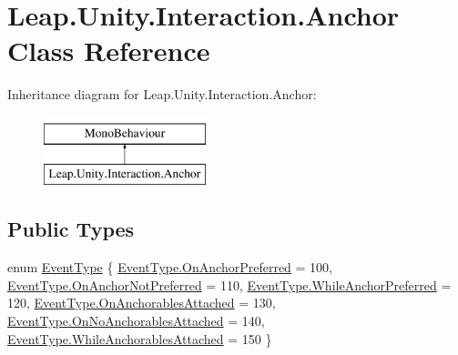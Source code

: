 \hypertarget{class_leap_1_1_unity_1_1_interaction_1_1_anchor}{}\section{Leap.\+Unity.\+Interaction.\+Anchor Class Reference}
\label{class_leap_1_1_unity_1_1_interaction_1_1_anchor}
Inheritance diagram for Leap.\+Unity.\+Interaction.\+Anchor\+:\begin{figure}[H]
\begin{center}
\leavevmode
\includegraphics[height=2.000000cm]{class_leap_1_1_unity_1_1_interaction_1_1_anchor}
\end{center}
\end{figure}
\subsection*{Public Types}
\begin{DoxyCompactItemize}
\item 
enum \mbox{\hyperlink{class_leap_1_1_unity_1_1_interaction_1_1_anchor_ac467f8e75926408d0fc27e8e0e132204}{Event\+Type}} \{ \newline
\mbox{\hyperlink{class_leap_1_1_unity_1_1_interaction_1_1_anchor_ac467f8e75926408d0fc27e8e0e132204ab9c49a1320c318c46f98e4e02e78a9c7}{Event\+Type.\+On\+Anchor\+Preferred}} = 100, 
\mbox{\hyperlink{class_leap_1_1_unity_1_1_interaction_1_1_anchor_ac467f8e75926408d0fc27e8e0e132204ae38f959948bfc1c8423a9e67693147b1}{Event\+Type.\+On\+Anchor\+Not\+Preferred}} = 110, 
\mbox{\hyperlink{class_leap_1_1_unity_1_1_interaction_1_1_anchor_ac467f8e75926408d0fc27e8e0e132204a6fc7654a77a62ecced65789982382ce5}{Event\+Type.\+While\+Anchor\+Preferred}} = 120, 
\mbox{\hyperlink{class_leap_1_1_unity_1_1_interaction_1_1_anchor_ac467f8e75926408d0fc27e8e0e132204a41d6be744712c717e0d2da74dc463d60}{Event\+Type.\+On\+Anchorables\+Attached}} = 130, 
\newline
\mbox{\hyperlink{class_leap_1_1_unity_1_1_interaction_1_1_anchor_ac467f8e75926408d0fc27e8e0e132204a9d436b056d7a97cd40a7335d183842bd}{Event\+Type.\+On\+No\+Anchorables\+Attached}} = 140, 
\mbox{\hyperlink{class_leap_1_1_unity_1_1_interaction_1_1_anchor_ac467f8e75926408d0fc27e8e0e132204aea5920a355dd21a4d622d76de7fceed2}{Event\+Type.\+While\+Anchorables\+Attached}} = 150
 \}
\end{DoxyCompactItemize}
